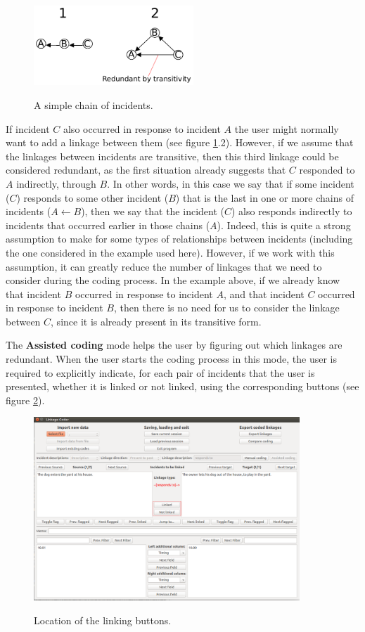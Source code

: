 \documentclass{memoir}
\begin{document}
\begin{figure}[h!]
  \centering
  \caption{A simple chain of incidents.}
  \includegraphics[width=60mm]{Diagram_7.pdf}
  \label{fig:simplechain}
\end{figure}

If incident \(C\) also occurred in response to incident \(A\) the user might normally want to add a linkage between them (see figure \ref{fig:simplechain}.2). However, if we assume that the linkages between incidents are transitive, then this third linkage could be considered redundant, as the first situation already suggests that \(C\) responded to \(A\) indirectly, through \(B\). In other words, in this case we say that if some incident (\(C\)) responds to some other incident (\(B\)) that is the last in one or more chains of incidents (\(A \leftarrow B\)), then we say that the incident (\(C\)) also responds indirectly to incidents that occurred earlier in those chains (\(A\)). Indeed, this is quite a strong assumption to make for some types of relationships between incidents (including the one considered in the example used here). However, if we work with this assumption, it can greatly reduce the number of linkages that we need to consider during the coding process. In the example above, if we already know that incident \(B\) occurred in response to incident \(A\), and that incident \(C\) occurred in response to incident \(B\), then there is no need for us to consider the linkage between \(C\), since it is already present in its transitive form.

The \textbf{Assisted coding} mode helps the user by figuring out which linkages are redundant. When the user starts the coding process in this mode, the user is required to explicitly indicate, for each pair of incidents that the user is presented, whether it is linked or not linked, using the corresponding buttons (see figure \ref{fig:linkbuttons}). 

\begin{figure}[h!]
  \centering
  \caption{Location of the linking buttons.}
  \includegraphics[width=100mm]{Screenshot_27.pdf}
  \label{fig:linkbuttons}
\end{figure}
\end{document}
